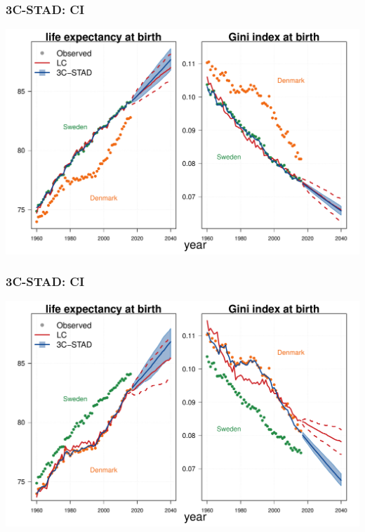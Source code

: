 \documentclass[12pt, xcolor=table]{beamer}  %
\begin{document}
\begin{frame}[noframenumbering]\frametitle{3C-STAD: CI}

\vspace{-0.5cm}
	
	\begin{center}	
		\vspace{0.2cm}
		
		\includegraphics[scale=.42]{Figures/Ch3/F4_a2}
		
	\end{center}
	
\end{frame}

\begin{frame}[noframenumbering]\frametitle{3C-STAD: CI}

\vspace{-0.5cm}

	
	\begin{center}	
		\vspace{0.2cm}
		
		\includegraphics[scale=.42]{Figures/Ch3/F4_a3}
		
	\end{center}
	
\end{frame}
\end{document}
